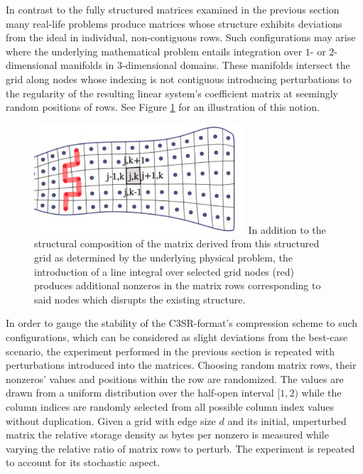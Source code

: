     In contrast to the fully structured matrices examined in the previous section many real-life problems produce
    matrices whose structure exhibits deviations from the ideal in individual, non-contiguous rows. Such configurations
    may arise where the underlying mathematical problem entails integration over $1$- or $2$-dimensional manifolds in
    $3$-dimensional domains. These manifolds intersect the grid along nodes whose indexing is not contiguous introducing
    perturbations to the regularity of the resulting linear system's coefficient matrix at seemingly random positions of
    rows. See Figure \ref{fig:structured-grid-with-path} for an illustration of this notion.

    \begin{figure}[H]
      \centering
      \captionsetup{width=0.9\textwidth}
      \includegraphics[width=0.7\textwidth]{assets/structured-grid-integration-path}
        {In addition to the structural composition of the matrix derived from this structured grid as determined by the
        underlying physical problem, the introduction of a line integral over selected grid nodes (red) produces additional
        nonzeros in the matrix rows corresponding to said nodes which disrupts the existing structure.}
      \label{fig:structured-grid-with-path}
    \end{figure}

    In order to gauge the stability of the C3SR-format's compression scheme to such configurations, which can be
    considered as slight deviations from the best-case scenario, the experiment performed in the previous section is
    repeated with perturbations introduced into the matrices. Choosing random matrix rows, their nonzeros' values and
    positions within the row are randomized. The values are drawn from a uniform distribution over the half-open
    interval $[1, 2)$ while the column indices are randomly selected from all possible column index values without
    duplication. Given a grid with edge size $d$ and its initial, unperturbed matrix the relative storage density as
    bytes per nonzero is measured while varying the relative ratio of matrix rows to perturb. The experiment is repeated
    to account for its stochastic aspect.

